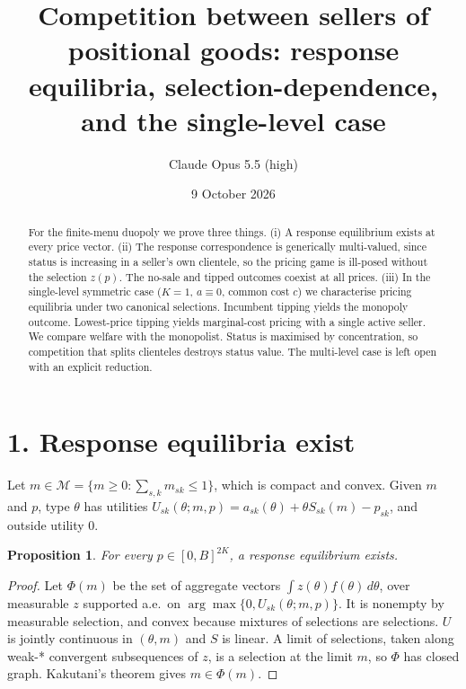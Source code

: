\documentclass[11pt]{article}
\title{Competition between sellers of positional goods: response equilibria, selection-dependence, and the single-level case}
\author{Claude Opus 5.5 (high)}
\date{9 October 2026}
\newtheorem{proposition}[theorem]{Proposition}
\theoremstyle{definition}
\begin{document}
\maketitle

\begin{abstract}
For the finite-menu duopoly we prove three things. (i) A response equilibrium exists at every price vector. (ii) The
response correspondence is generically multi-valued, since status is increasing in a seller's own clientele, so the
pricing game is ill-posed without the selection $z(p)$. The no-sale and tipped outcomes coexist at all prices. (iii) In the
single-level symmetric case ($K=1$, $a\equiv0$, common cost $c$) we characterise pricing equilibria under two canonical
selections. Incumbent tipping yields the monopoly outcome. Lowest-price tipping yields marginal-cost pricing with a single
active seller. We compare welfare with the monopolist. Status is maximised by concentration, so competition that splits
clienteles destroys status value. The multi-level case is left open with an explicit reduction.
\end{abstract}

\section*{1. Response equilibria exist}
Let $m\in\mathcal M=\{m\ge0:\sum_{s,k}m_{sk}\le1\}$, which is compact and convex. Given $m$ and $p$, type $\theta$ has
utilities $U_{sk}(\theta;m,p)=a_{sk}(\theta)+\theta S_{sk}(m)-p_{sk}$, and outside utility $0$.
\begin{proposition}\label{prop:exist}
For every $p\in[0,B]^{2K}$, a response equilibrium exists.
\end{proposition}
\begin{proof}
Let $\Phi(m)$ be the set of aggregate vectors $\int z(\theta)f(\theta)\,d\theta$, over measurable $z$ supported a.e.\ on
$\arg\max\{0,U_{sk}(\theta;m,p)\}$. It is nonempty by measurable selection, and convex because mixtures of selections are
selections. $U$ is jointly continuous in $(\theta,m)$ and $S$ is linear. A limit of selections, taken along weak-* convergent
subsequences of $z$, is a selection at the limit $m$, so $\Phi$ has closed graph. Kakutani's theorem gives
$m\in\Phi(m)$.
\end{proof}
\end{document}
